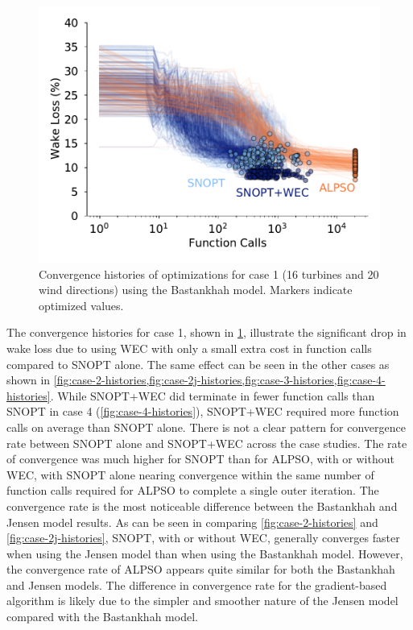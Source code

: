 \documentclass{jpconf}
\begin{document}
\begin{figure}[h!]
	\centering
	\begin{minipage}[t]{.45\textwidth}
		\centering
		\includegraphics[width=\textwidth]{final_images/results/convergence_history_BPAmodel_16turbs_20dirs}  
		\caption{Convergence histories of optimizations for case 1 (16 turbines and 20 wind directions) using the Bastankhah model. Markers indicate optimized values.}
		\label{fig:case-1-histories}
	\end{minipage}
\end{figure}

The convergence histories for case 1, shown in \cref{fig:case-1-histories}, illustrate the significant drop in wake loss due to using WEC with only a small extra cost in function calls compared to SNOPT alone. The same effect can be seen in the other cases as shown in \cref{fig:case-2-histories,fig:case-2j-histories,fig:case-3-histories,fig:case-4-histories}. While SNOPT+WEC did terminate in fewer function calls than SNOPT in case 4 (\cref{fig:case-4-histories}), SNOPT+WEC required more function calls on average than SNOPT alone. There is not a clear pattern for convergence rate between SNOPT alone and SNOPT+WEC across the case studies. The rate of convergence was much higher for SNOPT than for ALPSO, with or without WEC, with SNOPT alone nearing convergence within the same number of function calls required for ALPSO to complete a single outer iteration. The convergence rate is the most noticeable difference between the Bastankhah and Jensen model results. As can be seen in comparing \cref{fig:case-2-histories} and \cref{fig:case-2j-histories}, SNOPT, with or without WEC, generally converges faster when using the Jensen model than when using the Bastankhah model. However, the convergence rate of ALPSO appears quite similar for both the Bastankhah and Jensen models. The difference in convergence rate for the gradient-based algorithm is likely due to the simpler and smoother nature of the Jensen model compared with the Bastankhah model.
\end{document}
